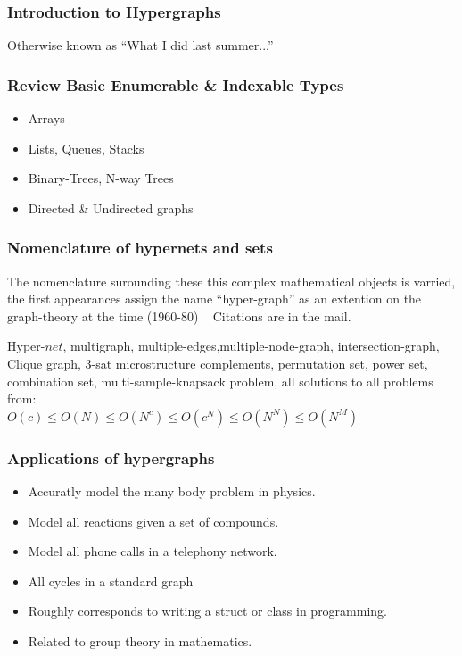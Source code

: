 \documentclass{beamer}
\begin{document}
	\begin{frame}
	\frametitle{Introduction to Hypergraphs}

	Otherwise known as ``What I did last summer...''

	\end{frame}
	
	\begin{frame}	
	\frametitle{Review Basic Enumerable \& Indexable Types}
	\begin{center}
	\begin{itemize}
	\item Arrays\\
	\item Lists, Queues, Stacks
	\item Binary-Trees, N-way Trees
	\item Directed \& Undirected graphs
	\end{itemize}	
	\end{center}
	\end{frame}
	
	
	\begin{frame}	
	\frametitle{Nomenclature of hypernets and sets }
	\begin{center}
	The nomenclature surounding these this complex mathematical objects is varried, the first appearances assign the name ``hyper-graph'' as an extention on the graph-theory at the time (1960-80) ~ Citations are in the mail. \\
	\end{center}
\vspace{20 pt}
	\begin{center}
	Hyper-$net$, multigraph, multiple-edges,multiple-node-graph, intersection-graph, Clique graph, 3-sat microstructure complements, permutation set, power set, combination set, multi-sample-knapsack problem, all solutions to all problems from:\\
	\vspace{10 pt}
	 $O(c) \leq O(N) \leq O(N^c) \leq O(c^N) \leq O(N^N) \leq O(N^M)$ 
	\end{center}
	\end{frame}

	\begin{frame}	
	\frametitle{Applications of hypergraphs }
	\begin{itemize}
	\item Accuratly model the many body problem in physics.
	\item Model all reactions given a set of compounds.
	\item Model all phone calls in a telephony network.
	\item All cycles in a standard graph	
	\item Roughly corresponds to writing a struct or class in programming.
	\item Related to group theory in mathematics.
	\end{itemize}		
	\end{frame}	
	
\end{document}
